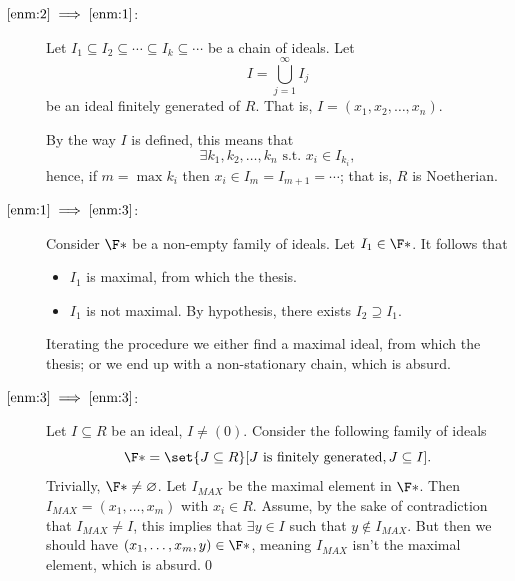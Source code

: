 \documentclass{subfiles}
\begin{document}
    \begin{proof*}
        \begin{description}
            \item [\(\ref{enm:2} \implies \ref{enm:1}\):] Let \(I_{1} \subseteq I_{2} \subseteq 
                \cdots \subseteq I_{k} \subseteq \cdots\) be a chain of ideals.
                Let  
                \[
                    I = \bigcup_{j = 1}^{\infty} I_{j}
                \]
                be an ideal finitely generated of \(R\).
                That is, \(I = (x_{1}, x_{2}, \ldots, x_{n})\).

                By the way \(I\) is defined, this means that 
                \[
                    \exists k_{1}, k_{2}, \ldots, k_{n} \text{ s.t. } x_{i} \in I_{k_{i}},
                \]
                hence, if \(m = \max{k_{i}}\) then \(x_{i} \in I_{m} = I_{m + 1} = \cdots\);
                that is, \(R\) is Noetherian.

            \item [\(\ref{enm:1} \implies \ref{enm:3}\):] Consider \(\F*\) be a non-empty family of ideals.
                Let \(I_{1} \in \F*\). It follows that 
                \begin{itemize}
                    \item \(I_{1}\) is maximal, from which the thesis.
                    \item \(I_{1}\) is not maximal. By hypothesis,
                        there exists \(I_{2} \supseteq I_{1}\).
                \end{itemize}
                Iterating the procedure we either find a maximal ideal,
                from which the thesis; or we end up with a non-stationary chain,
                which is absurd.

            \item [\(\ref{enm:3} \implies \ref{enm:3}\):] Let \(I \subseteq R\) be an ideal, 
                \(I \ne (0)\). Consider the following family of ideals
                \[
                    \F* = \set{J \subseteq R}[J \text{ is finitely generated}, J \subseteq I].
                \]
                Trivially, \(\F* \ne \varnothing\). Let \(I_{MAX}\) be the maximal element in \(\F*\).
                    Then \(I_{MAX} = (x_{1}, \ldots, x_{m})\) with \(x_{i} \in R\).
                    Assume, by the sake of contradiction that \(I_{MAX} \ne I\),
                    this implies that \(\exists y \in I\) such that \(y \notin I_{MAX}\).
                    But then we should have \((x_{1}, \ldots, x_{m}, y) \in \F*\),
                    meaning \(I_{MAX}\) isn't the maximal element, which is absurd.\qed
        \end{description}
    \end{proof*}
\end{document}
